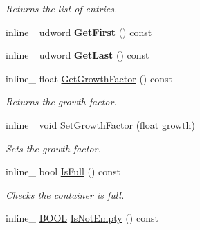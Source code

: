 \begin{DoxyCompactItemize}
\begin{DoxyCompactList}\small\item\em Returns the list of entries. \end{DoxyCompactList}\item 
\hypertarget{class_container_af6a9dce121bf062e798893a8cd4d0cf0}{inline\+\_\+ \hyperlink{_ice_types_8h_a44c6f1920ba5551225fb534f9d1a1733}{udword} {\bfseries Get\+First} () const }\label{class_container_af6a9dce121bf062e798893a8cd4d0cf0}

\item 
\hypertarget{class_container_a5e46c20fe6bb336b97ff5bffbbae2a35}{inline\+\_\+ \hyperlink{_ice_types_8h_a44c6f1920ba5551225fb534f9d1a1733}{udword} {\bfseries Get\+Last} () const }\label{class_container_a5e46c20fe6bb336b97ff5bffbbae2a35}

\item 
\hypertarget{class_container_aa5ea7054fb1e0510308a262fc2badc91}{inline\+\_\+ float \hyperlink{class_container_aa5ea7054fb1e0510308a262fc2badc91}{Get\+Growth\+Factor} () const }\label{class_container_aa5ea7054fb1e0510308a262fc2badc91}

\begin{DoxyCompactList}\small\item\em Returns the growth factor. \end{DoxyCompactList}\item 
\hypertarget{class_container_ae7bd83e18bd718683f03811dc4e1a83a}{inline\+\_\+ void \hyperlink{class_container_ae7bd83e18bd718683f03811dc4e1a83a}{Set\+Growth\+Factor} (float growth)}\label{class_container_ae7bd83e18bd718683f03811dc4e1a83a}

\begin{DoxyCompactList}\small\item\em Sets the growth factor. \end{DoxyCompactList}\item 
\hypertarget{class_container_ab4f4c688a934dfe321cf0404a788e76c}{inline\+\_\+ bool \hyperlink{class_container_ab4f4c688a934dfe321cf0404a788e76c}{Is\+Full} () const }\label{class_container_ab4f4c688a934dfe321cf0404a788e76c}

\begin{DoxyCompactList}\small\item\em Checks the container is full. \end{DoxyCompactList}\item 
\hypertarget{class_container_abc697b9791b85a99aeb31f7a8cf1946f}{inline\+\_\+ \hyperlink{_ice_types_8h_a050c65e107f0c828f856a231f4b4e788}{B\+O\+O\+L} \hyperlink{class_container_abc697b9791b85a99aeb31f7a8cf1946f}{Is\+Not\+Empty} () const }\label{class_container_abc697b9791b85a99aeb31f7a8cf1946f}


\end{DoxyCompactItemize}
